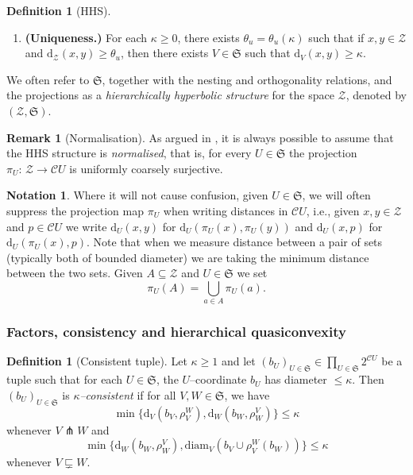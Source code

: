 \documentclass[svgnames]{amsart}
\theoremstyle{plain}
\theoremstyle{definition}
\newtheorem{defn}[thm]{Definition}
\newtheorem{rem}[thm]{Remark}
\newtheorem{notation}[thm]{Notation}
\newcommand{\frakS}{\mathfrak S}
\newcommand{\diam}{\mathrm{diam}}
\newcommand{\C}{\mathcal C}
\newcommand{\dist}{\mathrm{d}}
\newcommand{\propnest}{\sqsubsetneq}
\newcommand{\transverse}{\pitchfork}
\newcommand{\cuco}[1]{{\mathcal #1}}
\begin{document}
\begin{defn}[HHS]
\begin{enumerate}
\item\textbf{(Uniqueness.)} For each $\kappa\geq 0$, there exists
$\theta_u=\theta_u(\kappa)$ such that if $x,y\in \cuco Z$ and
$\dist_{ \cuco Z}(x,y)\geq\theta_u$, then there exists $V\in\frakS$ such
that $\dist_V(x,y)\geq \kappa$.\label{item:dfs_uniqueness}
\end{enumerate}
We often refer to $\frakS$, together with the nesting and orthogonality relations, and the projections as a \emph{hierarchically hyperbolic structure} for the space $ \cuco Z$, denoted by $(\cuco Z,\frakS)$.
\end{defn}



\begin{rem}[Normalisation]\label{rem:normalise}
    As argued in \cite[Remark 1.3]{HHS_II}, it is always possible to assume that the HHS structure is \emph{normalised}, that is, for every $U\in \frakS$ the projection $\pi_U:\,\cuco Z\to \C  U$ is uniformly coarsely surjective.
\end{rem}


\begin{notation}\label{notation:suppress_pi}
Where it will not cause confusion, given $U\in\frakS$, we will often suppress the projection map $\pi_U$ when writing distances in $\C  U$, i.e., given $x,y\in \cuco Z$ and $p\in\C  U$  we write $\dist_U(x,y)$ for $\dist_U(\pi_U(x),\pi_U(y))$ and $\dist_U(x,p)$ for $\dist_U(\pi_U(x),p)$. Note that when we measure distance between a pair of sets (typically both of bounded diameter) we are taking the minimum distance between the two sets. Given $A\subseteq  \cuco Z$ and $U\in\frakS$ we set $$\pi_{U}(A)=\bigcup_{a\in A}\pi_{U}(a).$$
\end{notation}

\subsubsection{Factors, consistency and hierarchical quasiconvexity}
\begin{defn}[Consistent tuple]\label{defn:consistent_tuple}
Let $\kappa\geq1$ and let $(b_U)_{U\in\frakS}\in\prod_{U\in\frakS}2^{\C   U}$ be a tuple such that for each $U\in\frakS$, the $U$--coordinate  $b_U$ has diameter $\leq\kappa$.  Then $(b_U)_{U\in\frakS}$ is \emph{$\kappa$--consistent} if for all $V,W\in\frakS$, we have $$\min\{\dist_V(b_V,\rho^W_V),\dist_W(b_W,\rho^V_W)\}\leq\kappa$$
whenever $V\transverse W$ and 
$$\min\{\dist_W(b_W,\rho^V_W),\diam_V(b_V\cup\rho^W_V(b_W))\}\leq\kappa$$
whenever $V\propnest W$.
\end{defn}
\end{document}

